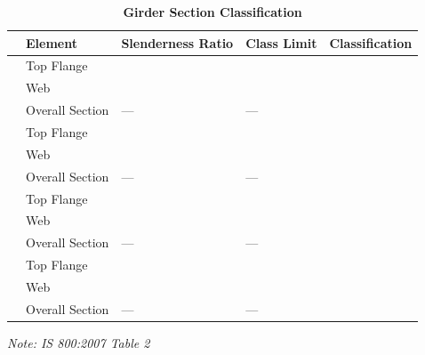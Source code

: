 \documentclass[12pt,a4paper]{report}
\numberwithin{table}{chapter}
\numberwithin{figure}{chapter}
\begin{document}
\vspace{1em}
\begin{longtable}{|C{2.5cm}|L{3cm}|C{3.5cm}|C{2.5cm}|>{\centering\arraybackslash}p{4.0cm}|}
\caption{\textbf{Girder Section Classification}}
\hline
\textbf{} & \textbf{Element} & \textbf{Slenderness Ratio} & \textbf{Class Limit} & \textbf{Classification} \\[6pt]
\hline
{} & Top Flange &  &  &  \\[6pt]
 & Web &  &  &  \\[6pt]
 & Overall Section & --- & --- &  \\[6pt]
\hline
{} & Top Flange &  &  &  \\[6pt]
 & Web &  &  &  \\[6pt]
 & Overall Section & --- & --- &  \\[6pt]
\hline
{} & Top Flange &  &  &  \\[6pt]
 & Web &  &  &  \\[6pt]
 & Overall Section & --- & --- &  \\[6pt]
\hline
{} & Top Flange &  &  &  \\[6pt]
 & Web &  &  &  \\[6pt]
 & Overall Section & --- & --- &  \\[6pt]
\hline
\end{longtable}
\noindent\textit{Note: IS 800:2007 Table 2}
\end{document}
